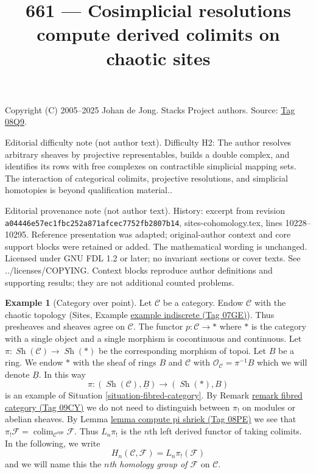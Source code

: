 \documentclass{amsart}
\theoremstyle{plain}
\theoremstyle{definition}
\newtheorem{example}[subsection]{Example}
\theoremstyle{remark}
\numberwithin{equation}{subsection}
\def\colim{\mathop{\mathrm{colim}}\nolimits}
\def\Sh{\mathop{\mathit{Sh}}\nolimits}
\begin{document}
\title[Stacks Project, Tag 08Q9]{661 --- Cosimplicial resolutions compute derived colimits on chaotic sites}
\maketitle
\noindent Copyright (C) 2005--2025 Johan de Jong. Stacks Project authors. Source: \href{https://stacks.math.columbia.edu/tag/08Q9}{Tag 08Q9}.

\noindent Editorial difficulty note (not author text). Difficulty H2: The author resolves arbitrary sheaves by projective representables, builds a double complex, and identifies its rows with free complexes on contractible simplicial mapping sets. The interaction of categorical colimits, projective resolutions, and simplicial homotopies is beyond qualification material..

\noindent Editorial provenance note (not author text). History: excerpt from revision \texttt{a0444\allowbreak 6e57e\allowbreak c1fbc\allowbreak 252a8\allowbreak 71afc\allowbreak ec775\allowbreak 2fb28\allowbreak 07b14}, sites-cohomology.tex, lines 10228--10295. Reference presentation was adapted; original-author context and core support blocks were retained or added. The mathematical wording is unchanged. Licensed under GNU FDL 1.2 or later; no invariant sections or cover texts. See ../licenses/COPYING. Context blocks reproduce author definitions and supporting results; they are not additional counted problems.

\begin{example}[Category over point]
\label{example-category-to-point}
Let $\mathcal{C}$ be a category. Endow $\mathcal{C}$ with the chaotic
topology (Sites, Example \href{https://stacks.math.columbia.edu/tag/07GE}{example indiscrete (Tag 07GE)}). Thus
presheaves and sheaves agree on $\mathcal{C}$.
The functor $p : \mathcal{C} \to *$ where $*$ is the category with a single
object and a single morphism is cocontinuous and continuous. Let
$\pi : \Sh(\mathcal{C}) \to \Sh(*)$ be the corresponding morphism
of topoi. Let $B$ be a ring. We endow $*$ with the sheaf of rings $B$
and $\mathcal{C}$ with $\mathcal{O}_\mathcal{C} = \pi^{-1}B$ which
we will denote $\underline{B}$. In this way
$$
\pi : (\Sh(\mathcal{C}), \underline{B}) \to (\Sh(*), B)
$$
is an example of Situation \ref{situation-fibred-category}.
By Remark \href{https://stacks.math.columbia.edu/tag/09CY}{remark fibred category (Tag 09CY)} we do not need to distinguish
between $\pi_!$ on modules or abelian sheaves. By
Lemma \href{https://stacks.math.columbia.edu/tag/08PE}{lemma compute pi shriek (Tag 08PE)} we see that
$\pi_!\mathcal{F} = \colim_{\mathcal{C}^{opp}} \mathcal{F}$.
Thus $L_n\pi_!$ is the $n$th left derived functor of taking colimits.
In the following, we write
$$
H_n(\mathcal{C}, \mathcal{F}) = L_n\pi_!(\mathcal{F})
$$
and we will name this the {\it $n$th homology group of $\mathcal{F}$}
on $\mathcal{C}$.
\end{example}
\end{document}
